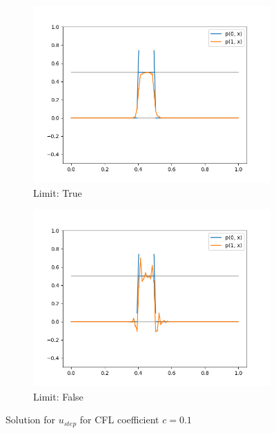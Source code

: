 \begin{figure}[h!]
	\centering
	\begin{subfigure}{.5\textwidth}	
		\centering	
		\includegraphics[width=\linewidth]{../figs/sols/adv1d_o2h100_limit}
		\caption{Limit: True}
	\end{subfigure}%
	\begin{subfigure}{.5\textwidth}
		\centering	
		\includegraphics[width=\linewidth]{../figs/sols/adv1d_o2h100_nolimit}
		\caption{Limit: False}
	\end{subfigure}
	\caption{ Solution for $u_{step}$ for CFL coefficient $c=0.1$}
	\label{fig:sol_adv1D} 
\end{figure}

